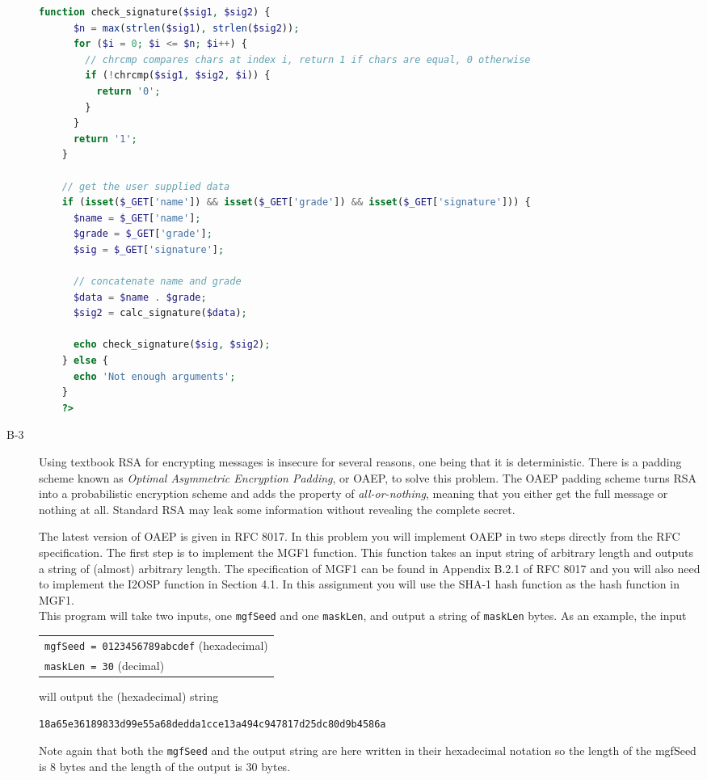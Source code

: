 \documentclass{article}
\begin{document}
\begin{description}
{\begin{lstlisting}[float=h, style=customc, language=php]
	function check_signature($sig1, $sig2) {
	  $n = max(strlen($sig1), strlen($sig2));
	  for ($i = 0; $i <= $n; $i++) {
	    // chrcmp compares chars at index i, return 1 if chars are equal, 0 otherwise
	    if (!chrcmp($sig1, $sig2, $i)) {
	      return '0';
	    }
	  }
	  return '1';
	}
	
	// get the user supplied data
	if (isset($_GET['name']) && isset($_GET['grade']) && isset($_GET['signature'])) {
	  $name = $_GET['name'];
	  $grade = $_GET['grade'];
	  $sig = $_GET['signature'];
	
	  // concatenate name and grade
	  $data = $name . $grade;
	  $sig2 = calc_signature($data);
	
	  echo check_signature($sig, $sig2);
	} else {
	  echo 'Not enough arguments';
	}
	?>
	\end{lstlisting}
				
			}	
			\item[B-3]{Using textbook RSA for encrypting messages is insecure for several reasons, one being that it
				is deterministic. There is a padding scheme known as \emph{Optimal Asymmetric Encryption Padding}, or OAEP, to solve
				this problem. The OAEP padding scheme turns RSA into a probabilistic encryption scheme and adds the property
				of \emph{all-or-nothing}, meaning that you either get the full message or nothing at all. Standard RSA may leak some
				information without revealing the complete secret.
				
				The latest version of OAEP is given in RFC 8017. In this problem you will implement OAEP in two steps directly from the RFC specification. The first step is to implement the MGF1 function. This function takes an input string of arbitrary length and outputs a string of (almost) arbitrary length. The specification of MGF1 can be found in Appendix B.2.1 of RFC 8017 and you will also need to implement the I2OSP function in Section 4.1. In this assignment you will use the SHA-1 hash function as the hash function in MGF1.\\
				This program will take two inputs, one \texttt{mgfSeed} and one \texttt{maskLen}, and output a string of \texttt{maskLen} bytes.
				As an example, the input
				\begin{center}
					\begin{tabular}{l}
						\texttt{mgfSeed = 0123456789abcdef} (hexadecimal)\\
						\texttt{maskLen = 30} (decimal)\\
					\end{tabular}
				\end{center}
				will output the (hexadecimal) string
				\begin{center}
					\texttt{18a65e36189833d99e55a68dedda1cce13a494c947817d25dc80d9b4586a}\\
				\end{center}
				Note again that both the \texttt{mgfSeed} and the output string are here written in their hexadecimal notation so the length of the mgfSeed is 8 bytes and the length of the output is 30 bytes.\\
				
}
\end{description}
\end{document}
